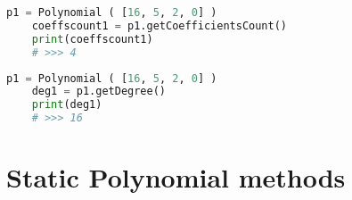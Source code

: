 \begin{lstlisting}[language=Python]
	p1 = Polynomial ( [16, 5, 2, 0] )
	coeffscount1 = p1.getCoefficientsCount()
	print(coeffscount1)
	# >>> 4
\end{lstlisting}

\begin{lstlisting}[language=Python]
	p1 = Polynomial ( [16, 5, 2, 0] )
	deg1 = p1.getDegree()
	print(deg1)
	# >>> 16
\end{lstlisting}

\section{Static Polynomial methods}